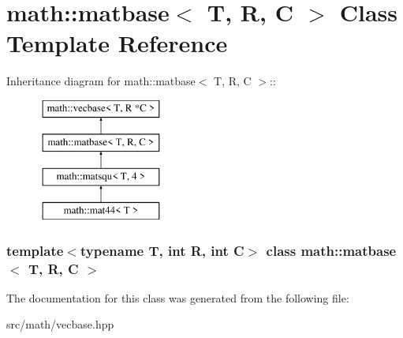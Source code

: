 \hypertarget{classmath_1_1matbase}{
\section{math::matbase$<$ T, R, C $>$ Class Template Reference}
\label{classmath_1_1matbase}
}
Inheritance diagram for math::matbase$<$ T, R, C $>$::\begin{figure}[H]
\begin{center}
\leavevmode
\includegraphics[height=4cm]{classmath_1_1matbase}
\end{center}
\end{figure}
\subsubsection*{template$<$typename T, int R, int C$>$ class math::matbase$<$ T, R, C $>$}



The documentation for this class was generated from the following file:\begin{DoxyCompactItemize}
\item 
src/math/vecbase.hpp\end{DoxyCompactItemize}
